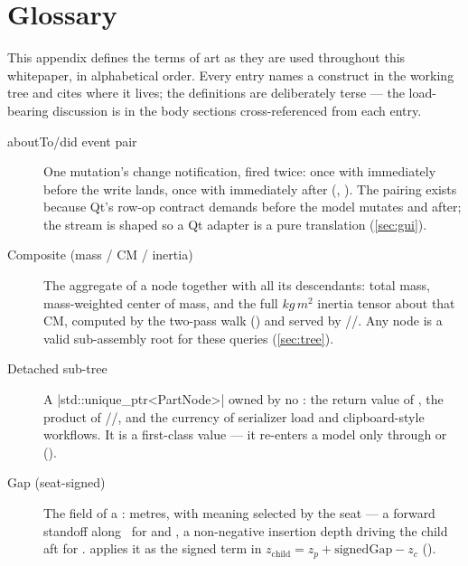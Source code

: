 \section{Glossary}\label{sec:glossary}

This appendix defines the terms of art as they are used throughout this whitepaper, in
alphabetical order. Every entry names a construct in the working tree and cites where it
lives; the definitions are deliberately terse --- the load-bearing discussion is in the
body sections cross-referenced from each entry.

\begin{description}

\item[aboutTo/did event pair] One mutation's change notification, fired twice: once with
   immediately before the write lands, once with  immediately after (,
  ). The pairing exists because Qt's
   row-op contract demands  before the model
  mutates and  after; the stream is shaped so a Qt adapter is a pure
  translation (\cref{sec:gui}).

\item[Composite (mass / CM / inertia)] The aggregate of a node together with all its
  descendants: total mass, mass-weighted center of mass, and the full
  $\unit{kg\,m^2}$ inertia tensor about that CM, computed by the two-pass walk
   () and served
  by //. Any node is a valid
  sub-assembly root for these queries (\cref{sec:tree}).

\item[Detached sub-tree] A \cppinline|std::unique_ptr<PartNode>| owned by no
  : the return value of , the product of
  //, and the currency of serializer
  load and clipboard-style workflows. It is a first-class value --- it re-enters a model
  only through  or 
  ().

\item[Gap (seat-signed)] The  field of a : metres, with
  meaning selected by the seat --- a forward standoff along \zfwd\ for  and
  , a non-negative insertion depth driving the child aft for
  .  applies it as the signed term in
  $z_{\mathrm{child}} = z_p + \mathrm{signedGap} - z_c$
  ().


\end{description}
